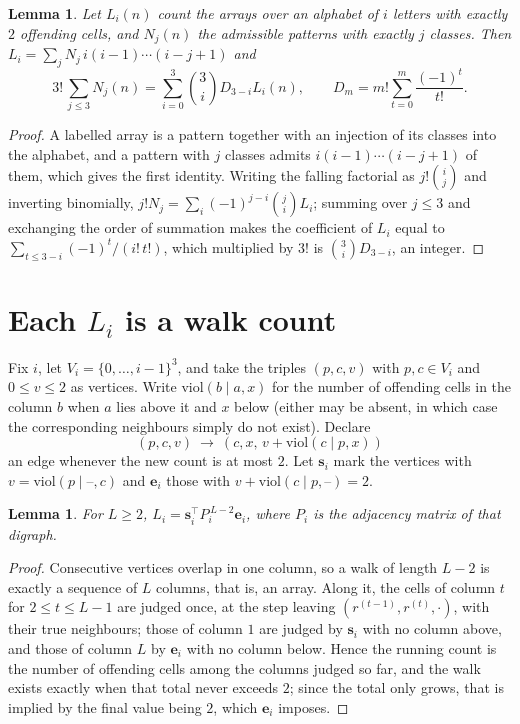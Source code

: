 \documentclass[11pt,a4paper]{article}
\theoremstyle{plain}
\newtheorem{lemma}[theorem]{Lemma}
\theoremstyle{definition}
\begin{document}
\begin{lemma}\label{lem:inv}
Let $L_i(n)$ count the arrays over an alphabet of $i$ letters with exactly $2$ offending
cells, and $N_j(n)$ the admissible patterns with exactly $j$ classes. Then
$L_i=\sum_j N_j\,i(i-1)\cdots(i-j+1)$ and
\[
3!\,\sum_{j\le3}N_j(n)=\sum_{i=0}^{3}\binom{3}{i}D_{3-i}L_i(n),
\qquad D_m=m!\sum_{t=0}^{m}\frac{(-1)^t}{t!} .
\]
\end{lemma}

\begin{proof}
A labelled array is a pattern together with an injection of its classes into the alphabet,
and a pattern with $j$ classes admits $i(i-1)\cdots(i-j+1)$ of them, which gives the first
identity. Writing the falling factorial as $j!\binom{i}{j}$ and inverting binomially,
$j!N_j=\sum_i(-1)^{j-i}\binom{j}{i}L_i$; summing over $j\le3$ and exchanging the
order of summation makes the coefficient of $L_i$ equal to
$\sum_{t\le3-i}(-1)^t/(i!\,t!)$, which multiplied by $3!$ is
$\binom{3}{i}D_{3-i}$, an integer.
\end{proof}

\section{Each $L_i$ is a walk count}

Fix $i$, let $V_i=\{0,\dots,i-1\}^{3}$, and take the triples $(p,c,v)$ with
$p,c\in V_i$ and $0\le v\le2$ as vertices. Write $\mathrm{viol}(b\mid a,x)$ for the number
of offending cells in the column $b$ when $a$ lies above it and $x$ below (either may be
absent, in which case the corresponding neighbours simply do not exist). Declare
\[
(p,c,v)\ \longrightarrow\ (c,x,\,v+\mathrm{viol}(c\mid p,x))
\]
an edge whenever the new count is at most $2$. Let $\mathbf{s}_i$ mark the vertices with
$v=\mathrm{viol}(p\mid\text{--},c)$ and $\mathbf{e}_i$ those with
$v+\mathrm{viol}(c\mid p,\text{--})=2$.

\begin{lemma}\label{lem:walk}
For $L\ge2$, $L_i=\mathbf{s}_i^{\!\top}P_i^{\,L-2}\mathbf{e}_i$, where $P_i$ is the
adjacency matrix of that digraph.
\end{lemma}

\begin{proof}
Consecutive vertices overlap in one column, so a walk of length $L-2$ is exactly a sequence
of $L$ columns, that is, an array. Along it, the cells of column $t$ for $2\le t\le L-1$ are
judged once, at the step leaving $(r^{(t-1)},r^{(t)},\cdot)$, with their true neighbours;
those of column $1$ are judged by $\mathbf{s}_i$ with no column above, and those of column
$L$ by $\mathbf{e}_i$ with no column below. Hence the running count is the number of
offending cells among the columns judged so far, and the walk exists exactly when that total
never exceeds $2$; since the total only grows, that is implied by the final value being
$2$, which $\mathbf{e}_i$ imposes.
\end{proof}
\end{document}
